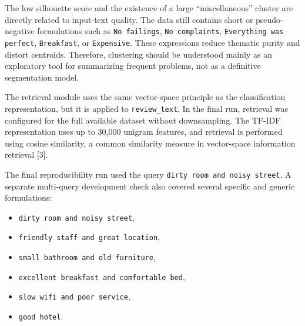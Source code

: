 \documentclass[twoside, 12pt]{article}
\begin{document}

The low silhouette score and the existence of a large ``miscellaneous'' cluster are directly related to input-text quality. The data still contains short or pseudo-negative formulations such as \texttt{No failings}, \texttt{No complaints}, \texttt{Everything was perfect}, \texttt{Breakfast}, or \texttt{Expensive}. These expressions reduce thematic purity and distort centroids. Therefore, clustering should be understood mainly as an exploratory tool for summarizing frequent problems, not as a definitive segmentation model.



The retrieval module uses the same vector-space principle as the classification representation, but it is applied to \texttt{review\_text}. In the final run, retrieval was configured for the full available dataset without downsampling. The TF-IDF representation uses up to 30,000 unigram features, and retrieval is performed using cosine similarity, a common similarity measure in vector-space information retrieval [3].


The final reproducibility run used the query \texttt{dirty room and noisy street}. A separate multi-query development check also covered several specific and generic formulations:

\begin{itemize}
    \item \texttt{dirty room and noisy street},
    \item \texttt{friendly staff and great location},
    \item \texttt{small bathroom and old furniture},
    \item \texttt{excellent breakfast and comfortable bed},
    \item \texttt{slow wifi and poor service},
    \item \texttt{good hotel}.
\end{itemize}

\end{document}
